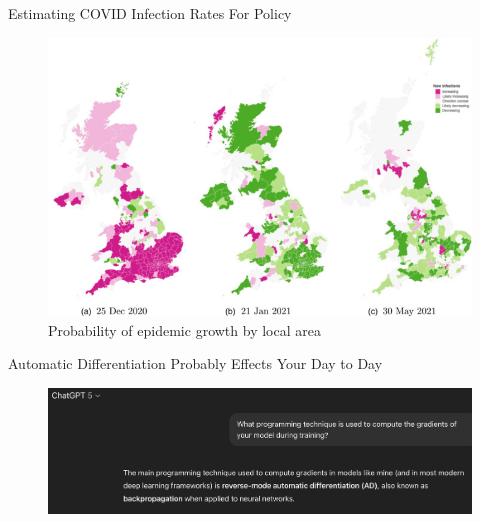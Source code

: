 \documentclass[dvipsnames]{beamer}
\begin{document}
\begin{frame}{Estimating COVID Infection Rates For Policy}
\begin{figure}
\centerline{\includegraphics[scale=.5]{img/covid_uk.jpg}}
\caption{Probability of epidemic growth by local area}
\label{fig-covid}
\end{figure}
\end{frame}

\begin{frame}{Automatic Differentiation Probably Effects Your Day to Day}
\begin{figure}
\centerline{\includegraphics[scale=.16]{img/chatgpt.png}}
\label{fig-chatgpt}
\end{figure}
\end{frame}

\end{document}
